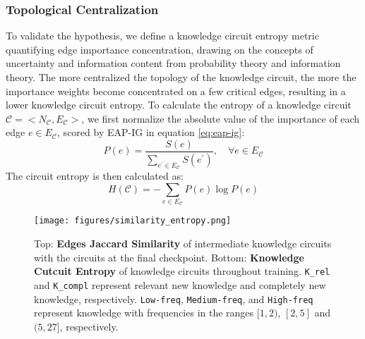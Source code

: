 \subsubsection{Topological Centralization}

To validate the hypothesis, we define a knowledge circuit entropy metric quantifying edge importance concentration, drawing on the concepts of uncertainty and information content from probability theory and information theory.
The more centralized the topology of the knowledge circuit, the more the importance weights become concentrated on a few critical edges, resulting in a lower knowledge circuit entropy.
To calculate the entropy of a knowledge circuit $\mathcal{C}=<N_{\mathcal{C}},E_{\mathcal{C}}>$, we first normalize the absolute value of the importance of each edge $e\in E_\mathcal{C}$, scored by EAP-IG in equation \eqref{eq:eap-ig}:
\begin{equation}
    P(e)=\frac{S(e)}{\sum_{e^{\prime} \in E_\mathcal{C}} S(e^{\prime})}, \quad \forall e \in E_\mathcal{C}
\end{equation}
The circuit entropy is then calculated as:
\begin{equation}
    H(\mathcal{C})=-\sum_{e\in E_{\mathcal{C}}} P(e)\log P(e)
\end{equation}

\begin{figure*}
    \centering
    \texttt{[image: figures/similarity\_entropy.png]}
    \caption{Top: \textbf{Edges Jaccard Similarity} of intermediate knowledge circuits with the circuits at the final checkpoint. Bottom: \textbf{Knowledge Cutcuit Entropy} of knowledge circuits throughout training. \texttt{K\_rel} and \texttt{K\_compl} represent relevant new knowledge and completely new knowledge, respectively. \texttt{Low-freq}, \texttt{Medium-freq}, and \texttt{High-freq} represent knowledge with frequencies in the ranges $[1, 2)$, $[2,5]$ and $(5, 27]$, respectively.}
    \label{fig:similarity_entropy}
    \vspace{-10pt}
\end{figure*}


